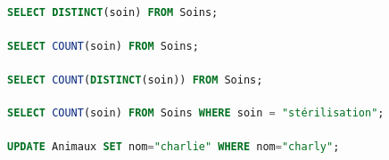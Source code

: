 \documentclass[svgnames,11pt]{beamer}
\begin{document}
\begin{frame}[fragile]
    \frametitle{}

\begin{center}
\begin{lstlisting}[language=SQL , basicstyle=\ttfamily\small, xleftmargin=1em, xrightmargin=0em]
SELECT DISTINCT(soin) FROM Soins;
\end{lstlisting}
\label{CODE}
\end{center}

\end{frame} 
\begin{frame}[fragile]
    \frametitle{}

\begin{center}
\begin{lstlisting}[language=SQL , basicstyle=\ttfamily\small, xleftmargin=1em, xrightmargin=0em]
SELECT COUNT(soin) FROM Soins;
\end{lstlisting}
\label{CODE}
\end{center}

\end{frame} 
\begin{frame}[fragile]
    \frametitle{}

\begin{center}
\begin{lstlisting}[language=SQL , basicstyle=\ttfamily\small, xleftmargin=1em, xrightmargin=0em]
SELECT COUNT(DISTINCT(soin)) FROM Soins;
\end{lstlisting}
\label{CODE}
\end{center}

\end{frame} 
\begin{frame}[fragile]
    \frametitle{}

\begin{center}
\begin{lstlisting}[language=SQL , basicstyle=\ttfamily\small, xleftmargin=1em, xrightmargin=0em]
SELECT COUNT(soin) FROM Soins WHERE soin = "stérilisation";
\end{lstlisting}
\label{CODE}
\end{center}

\end{frame} 
\begin{frame}[fragile]
    \frametitle{}

\begin{center}
\begin{lstlisting}[language=SQL , basicstyle=\ttfamily\small, xleftmargin=.5em, xrightmargin=0em]
UPDATE Animaux SET nom="charlie" WHERE nom="charly";
\end{lstlisting}
\label{CODE}
\end{center}

\end{frame} 
\end{document}
